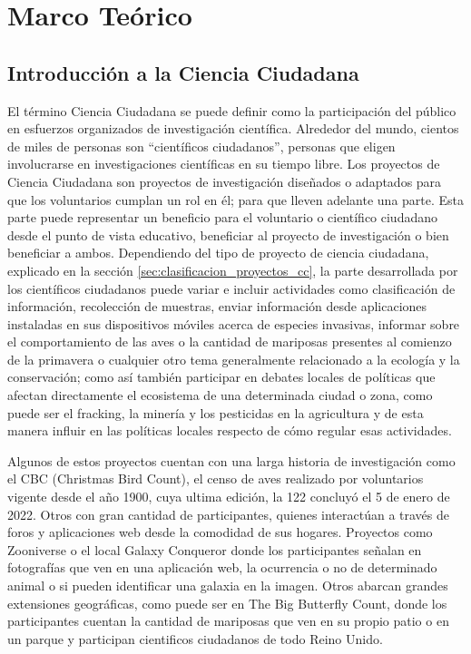 \chapter{Marco Teórico}
		
	
\section{Introducción a la Ciencia Ciudadana}
    
    El término Ciencia Ciudadana se puede definir como la participación del público en esfuerzos organizados de investigación científica. Alrededor del mundo, cientos de miles de personas son ``científicos ciudadanos'', personas que eligen involucrarse en investigaciones científicas en su tiempo libre. \cite{louv2012citizen} Los proyectos de Ciencia Ciudadana son proyectos de investigación diseñados o adaptados para que los voluntarios cumplan un rol en él; para que lleven adelante una parte. Esta parte puede representar un beneficio para el voluntario o científico ciudadano desde el punto de vista educativo, beneficiar al proyecto de investigación o bien beneficiar a ambos.\cite{silvertown2009new} Dependiendo del tipo de proyecto de ciencia ciudadana, explicado en la sección \ref{sec:clasificacion_proyectos_cc}, la parte desarrollada por los científicos ciudadanos puede variar e incluir actividades como clasificación de información, recolección de muestras, enviar información desde aplicaciones instaladas en sus dispositivos móviles acerca de especies invasivas, informar sobre el comportamiento de las aves o la cantidad de mariposas presentes al comienzo de la primavera o cualquier otro tema generalmente relacionado a la ecología y la conservación; como así también participar en debates locales de políticas que afectan directamente el ecosistema de una determinada ciudad o zona, como puede ser el fracking, la minería y los pesticidas en la agricultura y de esta manera influir en las políticas locales respecto de cómo regular esas actividades.\cite{envCitizenScience}
    
	Algunos de estos proyectos cuentan con una larga historia de investigación como el CBC (Christmas Bird Count)\cite{CBC}, el censo de aves realizado por voluntarios vigente desde el año 1900, cuya ultima edición, la 122 concluyó el 5 de enero de 2022. Otros con gran cantidad de participantes, quienes interactúan a través de foros y aplicaciones web desde la comodidad de sus hogares. Proyectos como Zooniverse\cite{Zooniverse} o el local Galaxy Conqueror\cite{GalaxyConqueror} donde los participantes señalan en fotografías que ven en una aplicación web, la ocurrencia o no de determinado animal o si pueden identificar una galaxia en la imagen. Otros abarcan grandes extensiones geográficas, como puede ser en The Big Butterfly Count\cite{Butterfly}, donde los participantes cuentan la cantidad de mariposas que ven en su propio patio o en un parque y participan cientificos ciudadanos de todo Reino Unido. 
		
